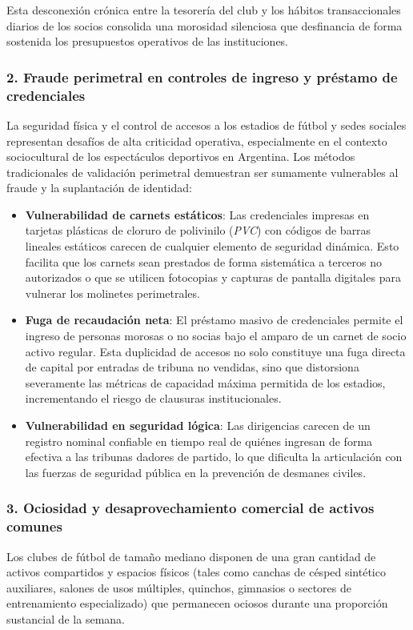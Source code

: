 Esta desconexión crónica entre la tesorería del club y los hábitos transaccionales diarios de los socios consolida una morosidad silenciosa que desfinancia de forma sostenida los presupuestos operativos de las instituciones.

\subsubsection{2. Fraude perimetral en controles de ingreso y préstamo de credenciales}
La seguridad física y el control de accesos a los estadios de fútbol y sedes sociales representan desafíos de alta criticidad operativa, especialmente en el contexto sociocultural de los espectáculos deportivos en Argentina. Los métodos tradicionales de validación perimetral demuestran ser sumamente vulnerables al fraude y la suplantación de identidad:
\begin{itemize}
    \item \textbf{Vulnerabilidad de carnets estáticos}: Las credenciales impresas en tarjetas plásticas de cloruro de polivinilo (\textit{PVC}) con códigos de barras lineales estáticos carecen de cualquier elemento de seguridad dinámica. Esto facilita que los carnets sean prestados de forma sistemática a terceros no autorizados o que se utilicen fotocopias y capturas de pantalla digitales para vulnerar los molinetes perimetrales.
    \item \textbf{Fuga de recaudación neta}: El préstamo masivo de credenciales permite el ingreso de personas morosas o no socias bajo el amparo de un carnet de socio activo regular. Esta duplicidad de accesos no solo constituye una fuga directa de capital por entradas de tribuna no vendidas, sino que distorsiona severamente las métricas de capacidad máxima permitida de los estadios, incrementando el riesgo de clausuras institucionales.
    \item \textbf{Vulnerabilidad en seguridad lógica}: Las dirigencias carecen de un registro nominal confiable en tiempo real de quiénes ingresan de forma efectiva a las tribunas dadores de partido, lo que dificulta la articulación con las fuerzas de seguridad pública en la prevención de desmanes civiles.
\end{itemize}

\subsubsection{3. Ociosidad y desaprovechamiento comercial de activos comunes}
Los clubes de fútbol de tamaño mediano disponen de una gran cantidad de activos compartidos y espacios físicos (tales como canchas de césped sintético auxiliares, salones de usos múltiples, quinchos, gimnasios o sectores de entrenamiento especializado) que permanecen ociosos durante una proporción sustancial de la semana. 

